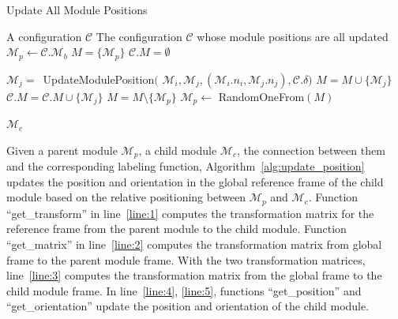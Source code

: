\documentclass[conference]{IEEEtran}
\theoremstyle{definition}
\begin{document}
\begin{algorithm}
\caption{Update All Module Positions}\label{alg:update_all_positions}
\begin{algorithmic}[1]
\Require
\Statex A configuration $\mathcal{C}$
\Ensure
\Statex The configuration $\mathcal{C}$ whose module positions are all updated
\Statex
\State $\mathcal{M}_p \gets \mathcal{C}.\mathcal{M}_b$ \label{line:6}
\State $M=\{\mathcal{M}_p\}$ \label{line:7}
\State $\mathcal{C}.M=\emptyset$ \label{line:8}

 \label{line:9}
 \label{line:10}
 \label{line:11}
\State $\mathcal{M}_j=$~UpdateModulePosition$($ \label{line:12}
\Statex \hspace{3cm}$\mathcal{M}_i, \mathcal{M}_j, (\mathcal{M}_i.n_i, \mathcal{M}_j.n_j), \mathcal{C}.\delta)$
\State $M=M\cup\{\mathcal{M}_j\}$ \label{line:13}
\State $\mathcal{C}.M=\mathcal{C}.M\cup\{\mathcal{M}_j\}$ \label{line:14}
\EndIf \label{line:15}
\EndFor \label{line:16}
\State $M=M \setminus \{\mathcal{M}_p\}$ \label{line:17}
\State $\mathcal{M}_p \gets$ RandomOneFrom$(M)$ \label{line:18}
\EndWhile \label{line:19}

\State \Return $\mathcal{M}_c$
\end{algorithmic}
\end{algorithm}

Given a parent module $\mathcal{M}_p$, a child module $\mathcal{M}_c$, the connection between them and the corresponding labeling function, Algorithm~\ref{alg:update_position} updates the position and orientation in the global reference frame of the child module based on the relative positioning between $\mathcal{M}_p$ and $\mathcal{M}_c$. Function ``get\_transform'' in line~\ref{line:1} computes the transformation matrix for the reference frame from the parent module to the child module. Function ``get\_matrix'' in line~\ref{line:2} computes the transformation matrix from global frame to the parent module frame. With the two transformation matrices, line~\ref{line:3} computes the transformation matrix from the global frame to the child module frame. In line~\ref{line:4}, \ref{line:5}, functions ``get\_position'' and ``get\_orientation'' update the position and orientation of the child module.
\end{document}
